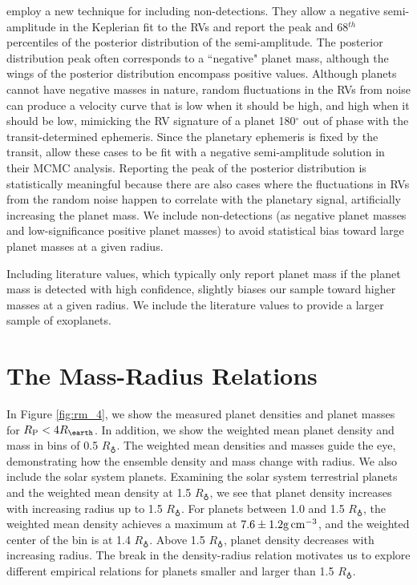 \documentclass[iop]{emulateapj}
\newcommand{\gcmc}{\ensuremath{\rm g\,cm^{-3}}}
\newcommand{\gcc}{\gcmc}
\newcommand{\rpl}{\ensuremath{R_{\rm P}}}
\newcommand{\rearth}{\ensuremath{R_\earth}}
\begin{document}
\citet{Marcy2014} employ a new technique for including non-detections.  They allow  a negative semi-amplitude in the Keplerian fit to the RVs and report the peak and 68$^{th}$ percentiles of the posterior distribution of the semi-amplitude.  The posterior distribution peak often corresponds to a ``negative" planet mass, although the wings of the posterior distribution encompass positive values.  Although planets cannot have negative masses in nature, random fluctuations in the RVs from noise can produce a velocity curve that is low when it should be high, and high when it should be low, mimicking the RV signature of a planet 180$^\circ$ out of phase with the transit-determined ephemeris.  Since the planetary ephemeris is fixed by the transit, \citet{Marcy2014} allow these cases to be fit with a negative semi-amplitude solution in their MCMC analysis.  Reporting the peak of the posterior distribution is statistically meaningful because there are also cases where the fluctuations in RVs from the random noise happen to correlate with the planetary signal, artificially increasing the planet mass.  We include non-detections (as negative planet masses and low-significance positive planet masses) to avoid statistical bias toward large planet masses at a given radius.

Including literature values, which typically only report planet mass if the planet mass is detected with high confidence, slightly biases our sample toward higher masses at a given radius.  We include the literature values to provide a larger sample of exoplanets.

\section{The Mass-Radius Relations}
In Figure \ref{fig:rm_4}, we show the measured planet densities and planet masses for $\rpl < 4 \rearth$.  In addition, we show the weighted mean planet density and mass in bins of 0.5 \rearth.  The weighted mean densities and masses guide the eye, demonstrating how the ensemble density and mass change with radius.  We also include the solar system planets.  Examining the solar system terrestrial planets and the weighted mean density at 1.5 \rearth, we see that planet density increases with increasing radius up to 1.5 \rearth.  For planets between 1.0 and 1.5 \rearth, the weighted mean density achieves a maximum at $7.6\pm1.2 \gcc$, and the weighted center of the bin is at 1.4 \rearth.  Above 1.5 \rearth, planet density decreases with increasing radius.  The break in the density-radius relation motivates us to explore different empirical relations for planets smaller and larger than 1.5 \rearth.
\end{document}
